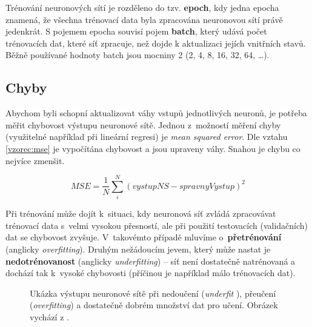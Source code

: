 Trénování neuronových sítí je rozděleno do tzv. \textbf{epoch}, kdy jedna epocha znamená, že všechna trénovací data byla zpracována neuronovou sítí právě jedenkrát. S pojemem epocha souvisí pojem \textbf{batch}, který udává počet trénovacích dat, které síť zpracuje, než dojde k aktualizaci jejích vnitřních stavů. Běžně používané hodnoty batch jsou mocniny 2 (2, 4, 8, 16, 32, 64, \dots). 

\subsection*{Chyby}
Abychom byli schopní aktualizovat váhy vstupů jednotlivých neuronů, je potřeba měřit chybovost výstupu neuronové sítě. Jednou z~možností měření chyby (využitelné například při lineární regresi) je \emph{mean squared error}. Dle vztahu \ref{vzorec:mse} je vypočítána chybovost a jsou upraveny váhy. Snahou je chybu co nejvíce zmenšit.

\begin{equation}
  \label{vzorec:mse}
  MSE = \frac{1}{N} \sum_{i}^{N} (vystupNS - spravnyVystup)^2
\end{equation}

Při trénování může dojít k~situaci, kdy neuronová síť zvládá zpracovávat trénovací data s~velmi vysokou přesností, ale při použití testovacích (validačních) dat se chybovost zvyšuje. V~takovémto případě mluvíme o~\textbf{přetrénování} (anglicky \emph{overfitting}). Druhým nežádoucím jevem, který může nastat je \textbf{nedotrénovanost} (anglicky \emph{underfitting}) -- síť není dostatečně natrénovaná a dochází tak k~vysoké chybovosti (příčinou je například málo trénovacích dat).


\begin{figure}[H]
  \begin{center}
  \label{obrazek:fitting}
  \caption{Ukázka výstupu neuronové sítě při nedoučení (\emph{underfit
  }), přeučení (\emph{overfitting}) a dostatečně dobrém množství dat pro učení. Obrázek vychází z \cite{deeplearningbook}.}
  \end{center}
\end{figure}


